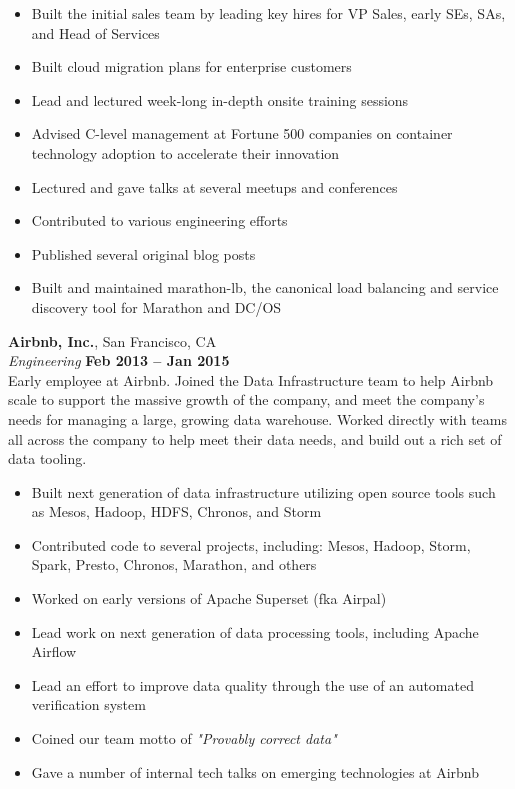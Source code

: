 \documentclass[margin,line]{resume}
\begin{document}
\begin{resume}
    \begin{itemize}
        \item Built the initial sales team by leading key hires for VP Sales,
        early SEs, SAs, and Head of Services
        \item Built cloud migration plans for enterprise customers
        \item Lead and lectured week-long in-depth onsite training sessions
        \item Advised C-level management at Fortune 500 companies on container
        technology adoption to accelerate their innovation
        \item Lectured and gave talks at several meetups and conferences
        \item Contributed to various engineering efforts
        \item Published several original blog posts
        \item Built and maintained marathon-lb, the canonical load balancing and
        service discovery tool for Marathon and DC/OS
    \end{itemize}

    \textbf{Airbnb, Inc.}, San Francisco, CA \vspace{2mm}\\\vspace{1mm}%
    \textsl{Engineering} \hfill \textbf{Feb 2013 -- Jan 2015}\\
    Early employee at Airbnb. Joined the Data Infrastructure team to help
    Airbnb scale to support the massive growth of the company, and meet the
    company's needs for managing a large, growing data warehouse. Worked
    directly with teams all across the company to help meet their data needs,
    and build out a rich set of data tooling.

    \begin{itemize}
        \item Built next generation of data infrastructure utilizing open source
        tools such as Mesos, Hadoop, HDFS, Chronos, and Storm
        \item Contributed code to several projects, including: Mesos, Hadoop,
        Storm, Spark, Presto, Chronos, Marathon, and others
        \item Worked on early versions of Apache Superset (fka Airpal)
        \item Lead work on next generation of data processing tools, including
        Apache Airflow
        \item Lead an effort to improve data quality through the use of an
        automated verification system
        \item Coined our team motto of \emph{"Provably correct data"}
        \item Gave a number of internal tech talks on emerging technologies at
        Airbnb
    \end{itemize}


\end{resume}
\end{document}

